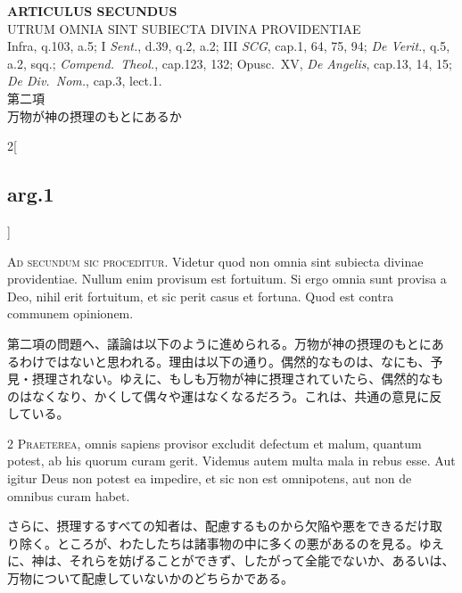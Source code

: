 \documentclass[paper=a4paper,fontsize=10pt,jafontsize=9pt,titlepage]{jlreq}
\begin{document}
\begin{center}
 {\Large {\bfseries ARTICULUS SECUNDUS}}\\
 {\large UTRUM OMNIA SINT SUBIECTA DIVINA PROVIDENTIAE}\\
 {\footnotesize Infra, q.103, a.5; I {\itshape Sent.}, d.39, q.2, a.2;
 III {\itshape SCG}, cap.1, 64, 75, 94; {\itshape De Verit.}, q.5, a.2,
 sqq.; {\itshape Compend.~Theol.}, cap.123, 132; Opusc.~XV, {\itshape De
 Angelis}, cap.13, 14, 15; {\itshape De Div.~Nom.}, cap.3, lect.1.}\\
 {\Large 第二項\\万物が神の摂理のもとにあるか}
\end{center}

\begin{paracol}{2}[\subsection{arg.1}]

{\Huge A}{\scshape d secundum sic proceditur}. Videtur quod
non omnia sint subiecta divinae providentiae. Nullum enim provisum est
fortuitum. Si ergo omnia sunt provisa a Deo, nihil erit fortuitum, et
sic perit casus et fortuna. Quod est contra communem opinionem.

\switchcolumn

第二項の問題へ、議論は以下のように進められる。万物が神の摂理のもとにあ
るわけではないと思われる。理由は以下の通り。偶然的なものは、なにも、予
見・摂理されない。ゆえに、もしも万物が神に摂理されていたら、偶然的なも
のはなくなり、かくして偶々や運はなくなるだろう。これは、共通の意見に反
している。


{\scshape 2 Praeterea}, omnis sapiens provisor excludit
defectum et malum, quantum potest, ab his quorum curam gerit. Videmus
autem multa mala in rebus esse. Aut igitur Deus non potest ea impedire,
et sic non est omnipotens, aut non de omnibus curam habet.

\switchcolumn

さらに、摂理するすべての知者は、配慮するものから欠陥や悪をできるだけ取
り除く。ところが、わたしたちは諸事物の中に多くの悪があるのを見る。ゆえ
に、神は、それらを妨げることができず、したがって全能でないか、あるいは、
万物について配慮していないかのどちらかである。


\end{paracol}
\end{document}
